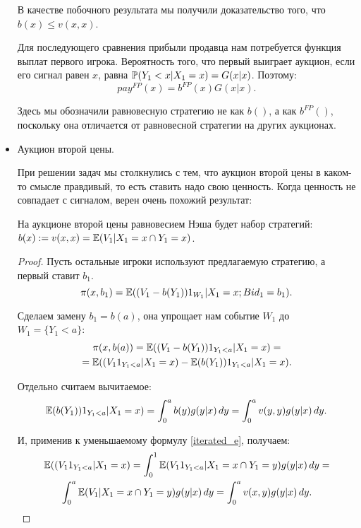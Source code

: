 \begin{itemize}
В качестве побочного результата мы получили доказательство того, что $ b(x)\leq v(x,x) $.

Для последующего сравнения прибыли продавца нам потребуется функция выплат первого игрока. Вероятность того, что первый выиграет аукцион, если его сигнал равен $ x $, равна $ \P(Y_{1}<x|X_{1}=x)=G(x|x)$. Поэтому:
\begin{equation}
pay^{FP}(x)=b^{FP}(x)G(x|x).
\end{equation}

Здесь мы обозначили равновесную стратегию не как $ b() $, а как $ b^{FP}() $, поскольку она отличается от равновесной стратегии на других аукционах.

\item Аукцион второй цены.

При решении задач мы столкнулись с тем, что аукцион второй цены в каком-то смысле правдивый, то есть ставить надо свою ценность. Когда ценность не совпадает с сигналом, верен очень похожий результат:

\begin{myth} \label{NE_SP}
На аукционе второй цены равновесием Нэша будет набор стратегий: $b(x):=v(x,x)=\E(V_{1}|X_{1}=x \cap Y_{1}=x)$.
\end{myth}
\begin{proof}
Пусть остальные игроки используют предлагаемую стратегию, а первый ставит $ b_{1} $.
\begin{equation}
\pi(x,b_{1})=\E((V_{1}-b(Y_{1}))1_{W_{1}}|X_{1}=x; Bid_{1}=b_{1}).
\end{equation}

Сделаем замену $ b_{1}=b(a) $, она упрощает нам событие $ W_{1} $ до $ W_{1}=\{Y_{1}<a\} $:
\begin{multline}
\pi(x,b(a))=\E((V_{1}-b(Y_{1}))1_{Y_{1}<a}|X_{1}=x)=\\
=\E((V_{1}1_{Y_{1}<a}|X_{1}=x)-\E(b(Y_{1}))1_{Y_{1}<a}|X_{1}=x).
\end{multline}

Отдельно считаем вычитаемое:
\begin{equation}
\E(b(Y_{1}))1_{Y_{1}<a}|X_{1}=x)=\int_{0}^{a}b(y)g(y|x) \, dy =
\int_{0}^{a}v(y,y)g(y|x) \, dy.
\end{equation}

И, применив к уменьшаемому формулу \ref{iterated_e}, получаем:
\begin{multline}
\E((V_{1}1_{Y_{1}<a}|X_{1}=x)=\int_{0}^{1}\E(V_{1}1_{Y_{1}<a}|X_{1}=
x \cap Y_{1}=y)g(y|x) \, dy=\\
\int_{0}^{a}\E(V_{1}|X_{1}=x \cap Y_{1}=y)g(y|x) \, dy=
\int_{0}^{a}v(x,y)g(y|x) \, dy.
\end{multline}



\end{proof}
\end{itemize}

